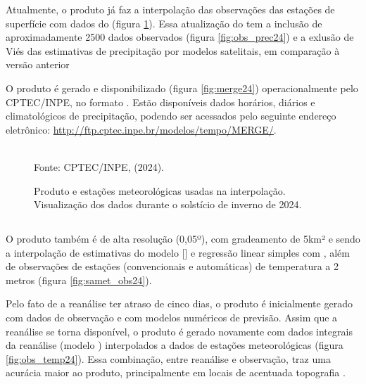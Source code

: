 \indent Atualmente, o produto  já faz a interpolação das observações das estações de superfície com dados do  (figura \ref{fig:merge_obs24}). Essa atualização do  tem a inclusão de aproximadamente 2500 dados observados (figura \ref{fig:obs_prec24}) e a exlusão de Viés das estimativas de precipitação por modelos satelitais, em comparação à versão anterior \cite{MERGEatual}

\indent O produto é gerado e disponibilizado (figura \ref{fig:merge24}) operacionalmente pelo \acrshort{CPTEC}/\acrshort{INPE}, no formato . Estão disponíveis dados horários, diários e climatológicos de precipitação, podendo ser acessados pelo seguinte endereço eletrônico: \url{http://ftp.cptec.inpe.br/modelos/tempo/MERGE/}.

\begin{figure}[htbp]
    \centering
    \caption{Produto  e estações meteorológicas usadas na interpolação. Visualização dos dados durante o solstício de inverno de 2024.} %
    \label{fig:merge_obs24}
    \hfill
    \\
    \small{Fonte: \acrshort{CPTEC}/\acrshort{INPE}, \citeauthor{MERGEatual} (2024).}
\end{figure}

\subsection{}

\indent O produto  também é de alta resolução (0,05º), com gradeamento de 5km² e sendo a interpolação de estimativas do modelo  [] e regressão linear simples com , além de observações de estações (convencionais e automáticas) de temperatura a 2 metros (figura \ref{fig:samet_obs24}).
 
\indent Pelo fato de a reanálise ter atraso de cinco dias, o produto é inicialmente gerado com dados de observação e com modelos numéricos de previsão. Assim que a reanálise se torna disponível, o produto é gerado novamente com dados integrais da reanálise (modelo ) interpolados a dados de estações meteorológicas (figura \ref{fig:obs_temp24}). Essa combinação, entre reanálise e observação, traz uma acurácia maior ao produto, principalmente em locais de acentuada topografia \cite{Rozante2021SAMeT}.

